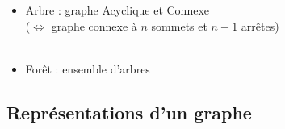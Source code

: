 \documentclass{beamer}
\let\oldsubsubsection\subsubsection
\renewcommand{\subsubsection}[2][]{\def\currentsubsubsection{#2}\oldsubsubsection[#1]{#2}}
\begin{document}
\begin{frame}
    \begin{itemize}
        \item Arbre : graphe Acyclique et Connexe
        \\($\Leftrightarrow$ graphe connexe à $n$ sommets et $n-1$ arrêtes)
        \\\usebox\arbre
        \\[0.3cm]
        \item Forêt : ensemble d'arbres
    \end{itemize}
\end{frame}

\subsection{Représentations d'un graphe}
\end{document}
